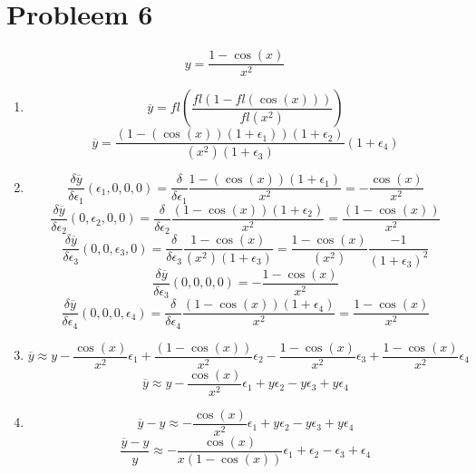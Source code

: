 \documentclass[12pt,a4paper]{article}
\begin{document}
\section{Probleem 6}

\[
y = \frac{1-\cos(x)}{x^2}
\]
\begin{enumerate}
\item
\[
\overline{y} = fl\left(\frac{fl(1-fl(\cos(x)))}{fl(x^2)}\right)
\]
\[
\overline{y} = \frac{(1-(\cos(x))(1+\epsilon_1))(1+\epsilon_2)}{(x^2)(1+\epsilon_3)}(1+\epsilon_4)
\]

\item
\[
\frac{\delta \overline{y}}{\delta \epsilon_1}(\epsilon_1,0,0,0)
= \frac{\delta}{\delta \epsilon_1}\frac{1-(\cos(x))(1+\epsilon_1)}{x^2} 
= -\frac{\cos(x)}{x^2}
\]
\[
\frac{\delta \overline{y}}{\delta \epsilon_2}(0,\epsilon_2,0,0)
= \frac{\delta}{\delta \epsilon_2}\frac{(1-\cos(x))(1+\epsilon_2)}{x^2}
= \frac{(1-\cos(x))}{x^2}
\]
\[
\frac{\delta \overline{y}}{\delta \epsilon_3}(0,0,\epsilon_3,0)
= \frac{\delta}{\delta \epsilon_3}\frac{1-\cos(x)}{(x^2)(1+\epsilon_3)} = \frac{1-\cos(x)}{(x^2)}\frac{-1}{(1+\epsilon_3)^2}
\]
\[
\frac{\delta \overline{y}}{\delta \epsilon_3}(0,0,0,0) = -\frac{1-\cos(x)}{x^2}
\]
\[
\frac{\delta \overline{y}}{\delta \epsilon_4}(0,0,0,\epsilon_4)
= \frac{\delta}{\delta \epsilon_4}\frac{(1-\cos(x))(1+\epsilon_4)}{x^2}
= \frac{1 - \cos(x)}{x^2}
\]

\item
\[
\overline{y} \approx y -\frac{\cos(x)}{x^2}\epsilon_1
+ \frac{(1-\cos(x))}{x^2}\epsilon_2
- \frac{1-\cos(x)}{x^2}\epsilon_3
+ \frac{1 - \cos(x)}{x^2}\epsilon_4
\]
\[
\overline{y} \approx y - \frac{\cos(x)}{x^2}\epsilon_1 + y\epsilon_2 - y\epsilon_3 + y\epsilon_4
\]
\item
\[
\overline{y}-y \approx - \frac{\cos(x)}{x^2}\epsilon_1 + y\epsilon_2 - y\epsilon_3 + y\epsilon_4
\]
\[
\frac{\overline{y}-y}{y} \approx - \frac{\cos(x)}{x(1-\cos(x))}\epsilon_1 + \epsilon_2 - \epsilon_3 + \epsilon_4
\]
\end{enumerate}
\end{document}
